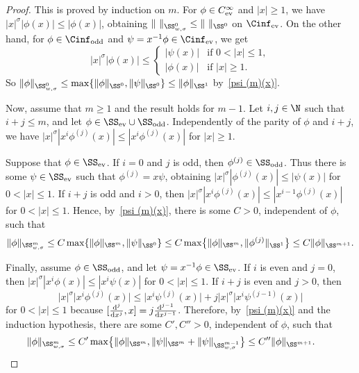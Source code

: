\begin{proof}
  This is proved by induction on $m$. For $\phi\in C^\infty_{\text{\rm ev}}$ and $|x|\ge1$, we have $|x|^\sigma |\phi(x)|\le|\phi(x)|$, obtaining $\|\ \|_{\SS_{w,\sigma}^0}\le\|\ \|_{\SS^0}$ on $\Cinf_{\text{\rm ev}}$. On the other hand, for $\phi\in\Cinf_{\text{\rm odd}}$ and $\psi=x^{-1}\phi\in\Cinf_{\text{\rm ev}}$, we get{\samepage
    \[
      |x|^\sigma|\phi(x)|\le
        \begin{cases}
          |\psi(x)| & \text{if $0<|x|\le1$},\\
          |\phi(x)| & \text{if $|x|\ge1$} .
        \end{cases}
    \]
  So $\|\phi\|_{\SS_{w,\sigma}^0}\le\max\{\|\phi\|_{\SS^0},\|\psi\|_{\SS^0}\}\le\|\phi\|_{\SS^1}$ by~\eqref{psi (m)(x)}.}

  Now, assume that $m\ge1$ and the result holds for $m-1$. Let $i,j\in\N$ such that $i+j\le m$, and let $\phi\in\SS_{\text{\rm ev}}\cup\SS_{\text{\rm odd}}$. Independently of the parity of $\phi$ and $i+j$, we have $|x|^\sigma |x^i\phi^{(j)}(x)|\le|x^i\phi^{(j)}(x)|$ for $|x|\ge1$.

  Suppose that $\phi\in\SS_{\text{\rm ev}}$. If $i=0$ and $j$ is odd, then $\phi^{(j)}\in\SS_{\text{\rm odd}}$. Thus there is some $\psi\in\SS_{\text{\rm ev}}$ such that $\phi^{(j)}=x\psi$, obtaining $|x|^\sigma|\phi^{(j)}(x)|\le|\psi(x)|$ for $0<|x|\le1$. If $i+j$ is odd and $i>0$, then $|x|^\sigma|x^i\phi^{(j)}(x)|\le|x^{i-1}\phi^{(j)}(x)|$ for $0<|x|\le1$. Hence, by~\eqref{psi (m)(x)}, there is some $C>0$, independent of $\phi$, such that
    \[
      \|\phi\|_{\SS_{w,\sigma}^m}\le C\max\{\|\phi\|_{\SS^m},\|\psi\|_{\SS^0}\}\le C\max\bigl\{\|\phi\|_{\SS^m},\|\phi^{(j)}\|_{\SS^1}\bigr\}\le C \|\phi\|_{\SS^{m+1}} .
    \]

  Finally, assume $\phi\in\SS_{\text{\rm odd}}$, and let $\psi=x^{-1}\phi\in\SS_{\text{\rm ev}}$. If $i$ is even and $j=0$, then $|x|^\sigma |x^i\phi(x)|\le|x^i\psi(x)|$ for $0<|x|\le1$. If $i+j$ is even and $j>0$, then
    \[
      |x|^\sigma\big|x^i\phi^{(j)}(x)\big|\le\big|x^i\psi^{(j)}(x)\big|+j |x|^\sigma\big|x^i\psi^{(j-1)}(x)\big|
    \]
  for $0<|x|\le1$ because $[\frac{{\rm d}^j}{{\rm d}x^j},x]=j \frac{{\rm d}^{j-1}}{{\rm d}x^{j-1}}$. Therefore, by~\eqref{psi (m)(x)} and the induction hypothesis, there are some $C',C''>0$, independent of $\phi$, such that
    \begin{gather*}
      \|\phi\|_{\SS_{w,\sigma}^m}\le C'\max\bigl\{\|\phi\|_{\SS^m},\|\psi\|_{\SS^m}+\|\psi\|_{\SS_{w,\sigma}^{m-1}}\bigr\}\le C'' \|\phi\|_{\SS^{m+1}} .
\tag*{\qed}
    \end{gather*}
\renewcommand{\qed}{}
\end{proof}


